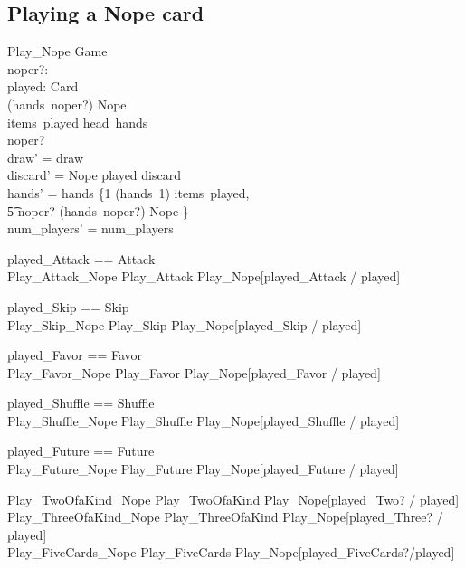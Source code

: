 \documentclass[11pt, fuzz]{article}
\begin{document}
\subsection{Playing a Nope card}

\begin{schema}{Play\_Nope}
    \Delta Game \\
    noper?: \nat \\
    played: \seq Card \\
\where
    (hands~noper?) \bcount Nope  \\
    items~played \subbageq head~hands \\
    noper?  \\
    draw' = draw \\
    discard' = \langle Nope \rangle \cat played \cat discard \\
    hands' = hands \oplus \{1 \mapsto (hands~1) \uminus items~played,\\ \t5 noper? \mapsto (hands~noper?) \uminus \lbag Nope \rbag \} \\
    num\_players' = num\_players
\end{schema}

\begin{zed}
    played\_Attack == \langle Attack \rangle \\
    Play\_Attack\_Nope  Play\_Attack \lor Play\_Nope[played\_Attack / played]
\end{zed}

\begin{zed}
    played\_Skip == \langle Skip \rangle \\
    Play\_Skip\_Nope  Play\_Skip \lor Play\_Nope[played\_Skip / played]
\end{zed}

\begin{zed}
    played\_Favor == \langle Favor \rangle \\
    Play\_Favor\_Nope  Play\_Favor \lor Play\_Nope[played\_Favor / played]
\end{zed}

\begin{zed}
    played\_Shuffle == \langle Shuffle \rangle \\
    Play\_Shuffle\_Nope  Play\_Shuffle \lor Play\_Nope[played\_Shuffle / played]
\end{zed}

\begin{zed}
    played\_Future == \langle Future \rangle \\
    Play\_Future\_Nope  Play\_Future \lor Play\_Nope[played\_Future / played]
\end{zed}


\begin{zed}
Play\_TwoOfaKind\_Nope  Play\_TwoOfaKind \lor Play\_Nope[played\_Two? / played] \\
Play\_ThreeOfaKind\_Nope  Play\_ThreeOfaKind \lor Play\_Nope[played\_Three? / played] \\
Play\_FiveCards\_Nope  Play\_FiveCards \lor Play\_Nope[played\_FiveCards?/played]
\end{zed}
\end{document}
